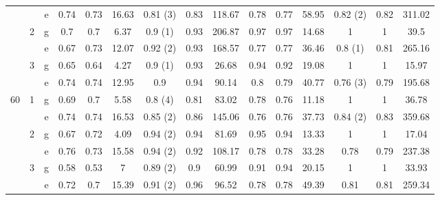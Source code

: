 \begin{table}[h!]
{\begin{tabular}{|c|c|c||ccc|ccc||ccc|ccc|}
          &       & e     & 0.74  & 0.73  & 16.63 & \textcolor[rgb]{ 1,  0,  0}{0.81 (3)} & 0.83  & 118.67 & 0.78  & 0.77  & 58.95 & \textcolor[rgb]{ 1,  0,  0}{0.82 (2)} & 0.82  & 311.02 \bigstrut[b]\\
\cline{2-15}          & \multirow{2}[2]{*}{2} & g     & 0.7   & 0.7   & 6.37  & \textcolor[rgb]{ 1,  0,  0}{0.9 (1)} & 0.93  & 206.87 & 0.97  & 0.97  & 14.68 & 1     & 1     & 39.5 \bigstrut[t]\\
          &       & e     & 0.67  & 0.73  & 12.07 & \textcolor[rgb]{ 1,  0,  0}{0.92 (2)} & 0.93  & 168.57 & 0.77  & 0.77  & 36.46 & \textcolor[rgb]{ 1,  0,  0}{0.8 (1)} & 0.81  & 265.16 \bigstrut[b]\\
\cline{2-15}          & \multirow{2}[2]{*}{3} & g     & 0.65  & 0.64  & 4.27  & \textcolor[rgb]{ 1,  0,  0}{0.9 (1)} & 0.93  & 26.68 & 0.94  & 0.92  & 19.08 & 1     & 1     & 15.97 \bigstrut[t]\\
          &       & e     & 0.74  & 0.74  & 12.95 & 0.9   & 0.94  & 90.14 & 0.8   & 0.79  & 40.77 & \textcolor[rgb]{ 1,  0,  0}{0.76 (3)} & 0.79  & 195.68 \bigstrut[b]\\
    \hline
    \hline
    \multirow{6}[6]{*}{60} & \multirow{2}[2]{*}{1} & g     & 0.69  & 0.7   & 5.58  & \textcolor[rgb]{ 1,  0,  0}{0.8 (4)} & 0.81  & 83.02 & 0.78  & 0.76  & 11.18 & 1     & 1     & 36.78 \bigstrut[t]\\
          &       & e     & 0.74  & 0.74  & 16.53 & \textcolor[rgb]{ 1,  0,  0}{0.85 (2)} & 0.86  & 145.06 & 0.76  & 0.76  & 37.73 & \textcolor[rgb]{ 1,  0,  0}{0.84 (2)} & 0.83  & 359.68 \bigstrut[b]\\
\cline{2-15}          & \multirow{2}[2]{*}{2} & g     & 0.67  & 0.72  & 4.09  & \textcolor[rgb]{ 1,  0,  0}{0.94 (2)} & 0.94  & 81.69 & 0.95  & 0.94  & 13.33 & 1     & 1     & 17.04 \bigstrut[t]\\
          &       & e     & 0.76  & 0.73  & 15.58 & \textcolor[rgb]{ 1,  0,  0}{0.94 (2)} & 0.92  & 108.17 & 0.78  & 0.78  & 33.28 & 0.78  & 0.79  & 237.38 \bigstrut[b]\\
\cline{2-15}          & \multirow{2}[2]{*}{3} & g     & 0.58  & 0.53  & 7     & \textcolor[rgb]{ 1,  0,  0}{0.89 (2)} & 0.9   & 60.99 & 0.91  & 0.94  & 20.15 & 1     & 1     & 33.93 \bigstrut[t]\\
          &       & e     & 0.72  & 0.7   & 15.39 & \textcolor[rgb]{ 1,  0,  0}{0.91 (2)} & 0.96  & 96.52 & 0.78  & 0.78  & 49.39 & 0.81  & 0.81  & 259.34 \bigstrut[b]\\
    \hline
    \end{tabular}}%
  \label{table:tab2}%
\end{table}%

